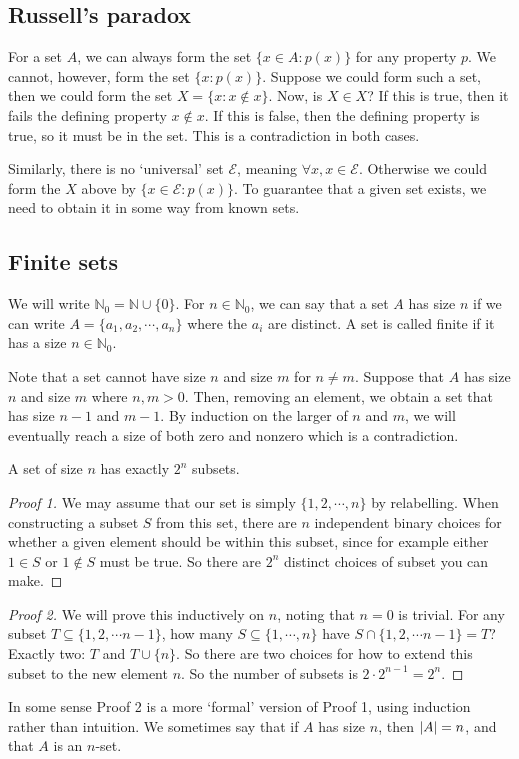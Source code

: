 \subsection{Russell's paradox}
For a set \(A\), we can always form the set \(\{ x \in A: p(x) \}\) for any property \(p\).
We cannot, however, form the set \(\{ x: p(x) \}\).
Suppose we could form such a set, then we could form the set \(X = \{ x: x \notin x \}\).
Now, is \(X \in X\)?
If this is true, then it fails the defining property \(x \notin x\).
If this is false, then the defining property is true, so it must be in the set.
This is a contradiction in both cases.

Similarly, there is no `universal' set \(\mathscr E\), meaning \(\forall x, x \in \mathscr E\).
Otherwise we could form the \(X\) above by \(\{ x \in \mathscr E: p(x) \}\).
To guarantee that a given set exists, we need to obtain it in some way from known sets.

\subsection{Finite sets}
We will write \(\mathbb N_0 = \mathbb N \cup \{ 0 \}\).
For \(n \in \mathbb N_0\), we can say that a set \(A\) has size \(n\) if we can write \(A = \{ a_1, a_2, \cdots, a_n \}\) where the \(a_i\) are distinct.
A set is called finite if it has a size \(n \in \mathbb N_0\).

Note that a set cannot have size \(n\) and size \(m\) for \(n \neq m\).
Suppose that \(A\) has size \(n\) and size \(m\) where \(n, m > 0\).
Then, removing an element, we obtain a set that has size \(n-1\) and \(m-1\).
By induction on the larger of \(n\) and \(m\), we will eventually reach a size of both zero and nonzero which is a contradiction.

\begin{proposition}
	A set of size \(n\) has exactly \(2^n\) subsets.
\end{proposition}
\begin{proof}[Proof 1]
	We may assume that our set is simply \(\{ 1, 2, \cdots, n \}\) by relabelling.
	When constructing a subset \(S\) from this set, there are \(n\) independent binary choices for whether a given element should be within this subset, since for example either \(1 \in S\) or \(1 \notin S\) must be true.
	So there are \(2^n\) distinct choices of subset you can make.
\end{proof}
\begin{proof}[Proof 2]
	We will prove this inductively on \(n\), noting that \(n=0\) is trivial.
	For any subset \(T \subseteq \{ 1, 2, \cdots n-1 \}\), how many \(S \subseteq \{ 1, \cdots, n \}\) have \(S \cap \{ 1, 2, \cdots n-1 \} = T\)?
	Exactly two: \(T\) and \(T \cup \{ n \}\).
	So there are two choices for how to extend this subset to the new element \(n\).
	So the number of subsets is \(2 \cdot 2^{n-1} = 2^n\).
\end{proof}
\noindent In some sense Proof 2 is a more `formal' version of Proof 1, using induction rather than intuition.
We sometimes say that if \(A\) has size \(n\), then \(\abs{A} = n\), and that \(A\) is an \(n\)-set.

